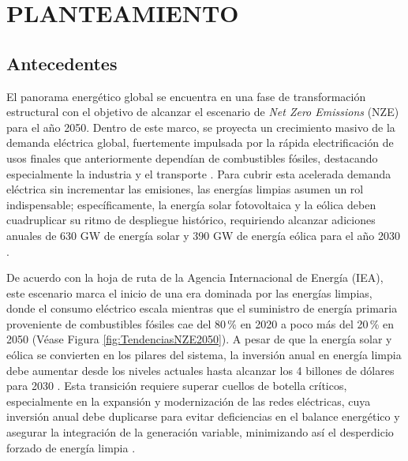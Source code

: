 \onehalfspacing
{}

\chapter{PLANTEAMIENTO}

\section{Antecedentes}

El panorama energético global se encuentra en una fase de transformación estructural con el objetivo de alcanzar el escenario de \textit{Net Zero Emissions} (NZE) para el año 2050. Dentro de este marco, se proyecta un crecimiento masivo de la demanda eléctrica global, fuertemente impulsada por la rápida electrificación de usos finales que anteriormente dependían de combustibles fósiles, destacando especialmente la industria y el transporte \citep{IEA_NZE_2021}. Para cubrir esta acelerada demanda eléctrica sin incrementar las emisiones, las energías limpias asumen un rol indispensable; específicamente, la energía solar fotovoltaica y la eólica deben cuadruplicar su ritmo de despliegue histórico, requiriendo alcanzar adiciones anuales de 630 GW de energía solar y 390 GW de energía eólica para el año 2030 \citep{IEA_NZE_2021}. 

De acuerdo con la hoja de ruta de la Agencia Internacional de Energía (IEA), este escenario marca el inicio de una era dominada por las energías limpias, donde el consumo eléctrico escala mientras que el suministro de energía primaria proveniente de combustibles fósiles cae del 80\,\% en 2020 a poco más del 20\,\% en 2050 (Véase Figura \ref{fig:TendenciasNZE2050}). A pesar de que la energía solar y eólica se convierten en los pilares del sistema, la inversión anual en energía limpia debe aumentar desde los niveles actuales hasta alcanzar los 4 billones de dólares para 2030 \citep{IEA_NZE_2021}. Esta transición requiere superar cuellos de botella críticos, especialmente en la expansión y modernización de las redes eléctricas, cuya inversión anual debe duplicarse para evitar deficiencias en el balance energético y asegurar la integración de la generación variable, minimizando así el desperdicio forzado de energía limpia \citep{IEA_WEO_2025}.

